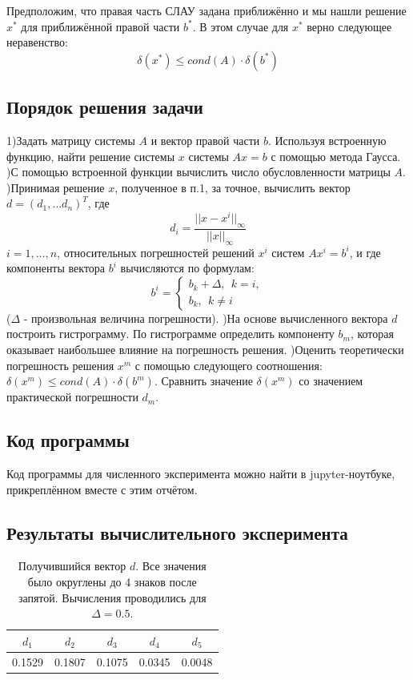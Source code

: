 \documentclass[12pt]{article}%
\begin{document}
Предположим, что правая часть СЛАУ задана приближённо и мы нашли решение $x^{*}$ для приближённой правой части $b^{*}$. В этом случае для $x^{*}$ верно следующее неравенство:
\begin{equation}
    \delta(x^{*}) \leqslant cond(A) \cdot \delta(b^{*})
\end{equation}

\subsection{Порядок решения задачи}
1)Задать матрицу системы $A$ и вектор правой части $b$. Используя встроенную функцию, найти решение системы $x$ системы $Ax=b$ с помощью метода Гаусса.
)С помощью встроенной функции вычислить число обусловленности матрицы $A$.
)Принимая решение $x$, полученное в п.1, за точное, вычислить вектор $d = (d_1, \dots d_n)^{T}$, где 
\[
d_i = \frac{||x - x^{i}||_{\infty}}{||x||_{\infty}} 
\]
$i = 1,\dots, n$, относительных погрешностей решений $x^{i}$ систем $Ax^{i} = b^{i}$, и где компоненты вектора $b^{i}$ вычисляются по формулам:
\[
b^{i} = \begin{cases}
            b_k + \Delta,\ \ k=i, \\
            b_k, \ \ k \ne i
        \end{cases}
\]
\newline
($\Delta$ - произвольная величина погрешности). 
)На основе вычисленного вектора $d$ построить гистрограмму. По гистрограмме определить компоненту $b_m$, которая оказывает наибольшее влияние на погрешность решения. 
)Оценить теоретически погрешность решения $x^m$ с помощью следующего соотношения:
$\delta(x^m) \leqslant cond(A) \cdot \delta(b^m)$. Сравнить значение $\delta(x^m)$ со значением практической погрешности $d_m$. 


\subsection{Код программы}
Код программы для численного эксперимента можно найти в jupyter-ноутбуке, прикреплённом вместе с этим отчётом.

\subsection{Результаты вычислительного эксперимента}
\begin{table}[h]
    \centering
    \begin{tabular}{|c|c|c|c|c|}
    
    \hline $d_1 $  &  $d_2$  &  $d_3$  &  $d_4$  &  $d_5$  \\
    \hline 0.1529  & 0.1807  & 0.1075  & 0.0345  & 0.0048  \\
    \hline
    \end{tabular}
    \caption{Получившийся вектор $d$. Все значения было округлены до 4 знаков после запятой. Вычисления проводились для $\Delta=0.5$.}
    \label{tab:d_vec}
\end{table}
\FloatBarrier
\end{document}
